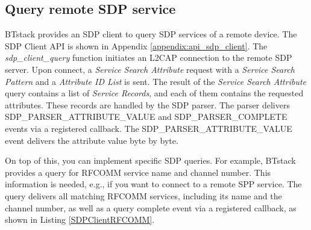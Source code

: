 \documentclass[a4paper,titlepage,oneside,12pt]{amsart} %
\begin{document}
\subsection{Query remote SDP service}

BTstack provides an SDP client to query SDP services of a remote device. The SDP Client API  is shown in Appendix \ref{appendix:api_sdp_client}. The \emph{sdp\_client\_query} function initiates an L2CAP connection to the remote SDP server. Upon connect, a \emph{Service Search Attribute} request with a \emph{Service Search Pattern} and a \emph{Attribute ID List} is sent. The result of the \emph{Service Search Attribute} query contains a list of \emph{Service Records}, and each of them contains the requested attributes. These records are handled by the SDP parser. The parser delivers SDP\_PARSER\_ATTRIBUTE\_VALUE and SDP\_PARSER\_COMPLETE events via a registered callback. The SDP\_PARSER\_ATTRIBUTE\_VALUE event delivers the attribute value byte by byte.

On top of this, you can implement specific SDP queries. For example, BTstack provides a query for RFCOMM service name and channel number. This information is needed, e.g., if you want to connect to a remote SPP service. The query delivers all matching RFCOMM services, including its name and the channel number, as well as a query complete  event via a registered callback, as shown in Listing \ref{SDPClientRFCOMM}.
\end{document}
